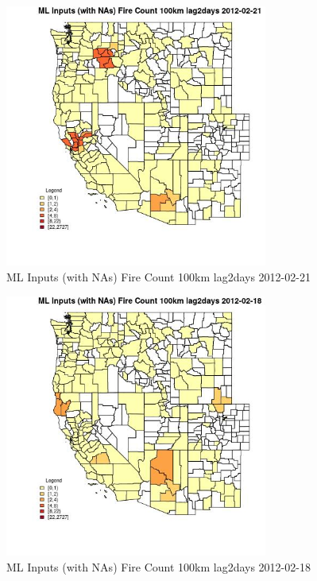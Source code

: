 \begin{figure} 
\centering  
\includegraphics[width=0.77\textwidth]{Code_Outputs/Report_ML_input_PM25_Step4_part_f_de_duplicated_aves_prioritize_24hr_obswNAs_CountyFire_Count_100km_lag2daysMean2012-02-21.jpg} 
\caption{\label{fig:Report_ML_input_PM25_Step4_part_f_de_duplicated_aves_prioritize_24hr_obswNAsCountyFire_Count_100km_lag2daysMean2012-02-21}ML Inputs (with NAs) Fire Count 100km lag2days 2012-02-21} 
\end{figure} 
 

\begin{figure} 
\centering  
\includegraphics[width=0.77\textwidth]{Code_Outputs/Report_ML_input_PM25_Step4_part_f_de_duplicated_aves_prioritize_24hr_obswNAs_CountyFire_Count_100km_lag2daysMean2012-02-18.jpg} 
\caption{\label{fig:Report_ML_input_PM25_Step4_part_f_de_duplicated_aves_prioritize_24hr_obswNAsCountyFire_Count_100km_lag2daysMean2012-02-18}ML Inputs (with NAs) Fire Count 100km lag2days 2012-02-18} 
\end{figure} 
 

